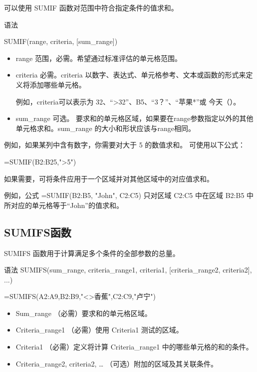 可以使用 SUMIF 函数对范围中符合指定条件的值求和。

语法

SUMIF(range, criteria, [sum\_range])

\begin{itemize}
    \item range 范围，必需。希望通过标准评估的单元格范围。 
    \item criteria   必需。criteria 以数字、表达式、单元格参考、文本或函数的形式来定义将添加哪些单元格。
    
    例如，criteria可以表示为 32、“>32”、B5、“3？”、“苹果*”或 今天（）。
    \item sum\_range   可选。 要求和的单元格区域，如果要在range参数指定以外的其他单元格求和。sum\_range 的大小和形状应该与range相同。
\end{itemize}

例如，如果某列中含有数字，你需要对大于 5 的数值求和。 可使用以下公式：

=SUMIF(B2:B25,">5")

如果需要，可将条件应用于一个区域并对其他区域中的对应值求和。

例如，公式 =SUMIF(B2:B5, "John", C2:C5) 只对区域 C2:C5 中在区域 B2:B5 中所对应的单元格等于“John”的值求和。

\subsection{SUMIFS函数}

SUMIFS 函数用于计算满足多个条件的全部参数的总量。 

语法
SUMIFS(sum\_range, criteria\_range1, criteria1, [criteria\_range2, criteria2], ...)

=SUMIFS(A2:A9,B2:B9,"<>香蕉",C2:C9,"卢宁")

\begin{itemize}
    \item Sum\_range   （必需）要求和的单元格区域。
    \item Criteria\_range1   （必需）使用 Criteria1 测试的区域。
    \item Criteria1   （必需）定义将计算 Criteria\_range1 中的哪些单元格的和的条件。
    \item Criteria\_range2, criteria2, …    （可选）附加的区域及其关联条件。 
\end{itemize}